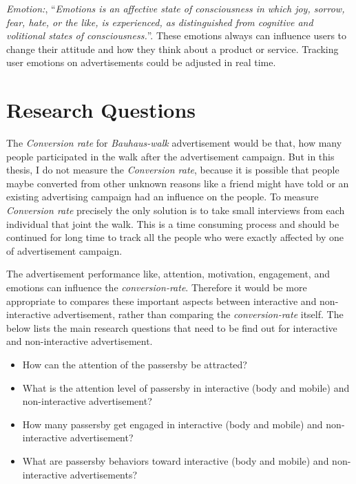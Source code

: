 \emph{Emotion:}, ``\emph{Emotions is an affective state of consciousness in which joy, sorrow, fear, hate, or the like, is experienced, as distinguished from cognitive and volitional states of consciousness.}''\cite{emotiondef}. These emotions always can influence users to change their attitude and how they think about a product or service. Tracking user emotions on advertisements could be adjusted in real time.



\section{Research Questions}
The \emph{Conversion rate} for \emph{Bauhaus-walk} advertisement would be that, how many people participated in the walk after the advertisement campaign. But in this thesis, I do not measure the \emph{Conversion rate}, because it is possible that people maybe converted from other unknown reasons like a friend might have told or an existing advertising campaign had an influence on the people. To measure \emph{Conversion rate} precisely the only solution is to take small interviews from each individual that joint the walk. This is a time consuming process and should be continued for long time to track all the people who were exactly affected by one of advertisement campaign.

The advertisement performance like, attention, motivation, engagement, and emotions can influence the \emph{conversion-rate}. Therefore it would be more appropriate to compares these important aspects between interactive and non-interactive advertisement, rather than comparing the \emph{conversion-rate} itself. The below lists the main research questions that need to be find out for interactive and non-interactive advertisement.


\begin{itemize}
\item How can the attention of the passersby be attracted? 
\item What is the attention level of passersby in interactive (body and mobile) and non-interactive advertisement?
\item How many passersby get engaged in interactive (body and mobile) and non-interactive advertisement?
\item What are passersby behaviors toward interactive (body and mobile) and non-interactive advertisements?
\end{itemize}



